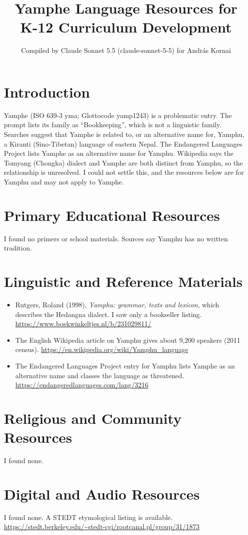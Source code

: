 \documentclass[12pt]{article}
\title{Yamphe Language Resources for K-12 Curriculum Development}
\author{Compiled by Claude Sonnet 5.5 (claude-sonnet-5-5) for Andr\'as Kornai}
\date{}
\begin{document}
\maketitle

\section{Introduction}
Yamphe (ISO 639-3 yma; Glottocode yamp1243) is a problematic entry. The prompt lists its family as ``Bookkeeping'', which is not a linguistic family. Searches suggest that Yamphe is related to, or an alternative name for, Yamphu, a Kiranti (Sino-Tibetan) language of eastern Nepal. The Endangered Languages Project lists Yamphe as an alternative name for Yamphu. Wikipedia says the Tomyang (Chongka) dialect and Yamphe are both distinct from Yamphu, so the relationship is unresolved. I could not settle this, and the resources below are for Yamphu and may not apply to Yamphe.

\section{Primary Educational Resources}
I found no primers or school materials. Sources say Yamphu has no written tradition.

\section{Linguistic and Reference Materials}
\begin{itemize}
\item Rutgers, Roland (1998), \emph{Yamphu: grammar, texts and lexicon}, which describes the Hedangna dialect. I saw only a bookseller listing. \url{https://www.boekwinkeltjes.nl/b/231029811/}
\item The English Wikipedia article on Yamphu gives about 9,200 speakers (2011 census). \url{https://en.wikipedia.org/wiki/Yamphu_language}
\item The Endangered Languages Project entry for Yamphu lists Yamphe as an alternative name and classes the language as threatened. \url{https://endangeredlanguages.com/lang/3216}
\end{itemize}

\section{Religious and Community Resources}
I found none.

\section{Digital and Audio Resources}
I found none. A STEDT etymological listing is available. \url{https://stedt.berkeley.edu/~stedt-cgi/rootcanal.pl/group/31/1873}
\end{document}
